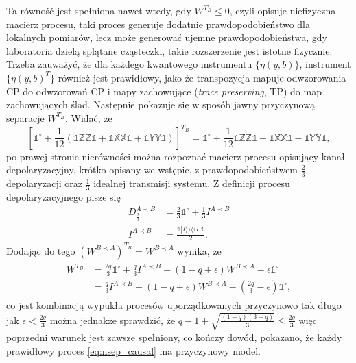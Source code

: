 \documentclass[10pt]{article} %
\newcommand{\BBra}[1]{\langle\langle#1|}
\newcommand{\KKet}[1]{|#1\rangle\rangle}
\newcommand{\X}{\mathbb{X}}
\newcommand{\Y}{\mathbb{Y}}
\newcommand{\Z}{\mathbb{Z}}
\newcommand{\I}{\mathbb{1}}
\newcommand{\IO}{\mathbb{1}^\circ}
\begin{document}
Ta równość jest spełniona nawet wtedy, gdy $W^{T_B} \leq 0$, czyli opisuje niefizyczna macierz procesu, taki proces generuje dodatnie prawdopodobieństwo dla lokalnych pomiarów, lecz może generować ujemne prawdopodobieństwa, gdy laboratoria dzielą splątane cząsteczki, takie rozszerzenie jest istotne fizycznie.
Trzeba zauważyć, że dla każdego kwantowego instrumentu $\{ \eta(y,b) \}$, instrument $\{ \eta(y,b)^T \}$ również jest prawidłowy, jako że transpozycja mapuje odwzorowania CP do odwzorowań CP i mapy zachowujące (\textit{trace preserving}, TP) do map zachowujących ślad. Następnie pokazuje się w sposób jawny przyczynową
separacje $W^{T_B}$. Widać, że 
\begin{equation}
\left[\IO + \frac{1}{12}\left(\I\Z\Z\I + \I\X\X\I + \I\Y\Y\I\right)\right]^{T_B} = \IO + \frac{1}{12}\I\Z\Z\I + \I\X\X\I - \I\Y\Y\I, 
\end{equation}
po prawej stronie nierówności można rozpoznać macierz procesu opisujący kanał depolaryzacyjny, krótko opisany we wstępie, z prawdopodobieństwem $\frac{2}{3}$ depolaryzacji oraz $\frac{1}{3}$ idealnej transmisji systemu.
Z definicji procesu depolaryzacyjnego pisze się
\begin{align}
D^{A \prec B}_{\frac{2}{3}} &= \frac{2}{3} \IO + \frac{1}{3}I^{A \prec B}  \\
I^{A \prec B} &= \frac{\I\KKet{I}\BBra{I}\I}{2}.
\end{align} Dodając do tego $\left(W^{B \prec A}\right)^{T_B} = W^{B \prec A}$
wynika, że 
\begin{align}
\label{eq:wtb_sep}
\begin{split}
W^{T_B} &= \frac{2q}{3}\IO + \frac{q}{3} I^{A \prec B} + (1-q+\epsilon)W^{B \prec A} - \epsilon \IO \\
 &= \frac{q}{3} I^{A \prec B} + (1-q+\epsilon) W^{B \prec A} - (\frac{2q}{3} - \epsilon) \IO,
\end{split}
\end{align} co jest kombinacją wypukła procesów uporządkowanych przyczynowo tak długo jak $\epsilon < \frac{2q}{3}$ można jednakże sprawdzić, że $q - 1 + \sqrt{\frac{(1-q)(3+q)}{3}} \leq \frac{2q}{3}$ więc poprzedni warunek jest zawsze spełniony, co kończy dowód, pokazano, że każdy prawidłowy proces \eqref{eq:nsep_causal} ma przyczynowy model.
\end{document}
